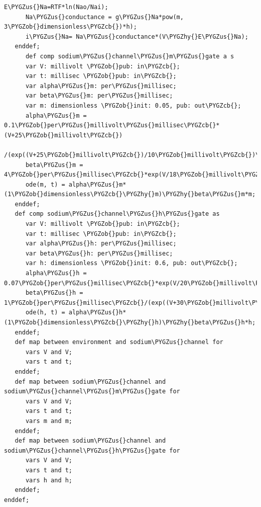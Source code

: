 \documentclass[a4paper,10pt,english]{sphinxmanual}
\def\PYGZus{\char`\_}
\def\PYGZob{\char`\{}
\def\PYGZcb{\char`\}}
\def\PYGZhy{\char`\-}
\begin{document}
\begin{Verbatim}[commandchars=\\\{\}]
      E\PYGZus{}Na=RTF*ln(Nao/Nai);
      Na\PYGZus{}conductance = g\PYGZus{}Na*pow(m, 3\PYGZob{}dimensionless\PYGZcb{})*h);
      i\PYGZus{}Na= Na\PYGZus{}conductance*(V\PYGZhy{}E\PYGZus{}Na);
   enddef;
      def comp sodium\PYGZus{}channel\PYGZus{}m\PYGZus{}gate a s
      var V: millivolt \PYGZob{}pub: in\PYGZcb{};
      var t: millisec \PYGZob{}pub: in\PYGZcb{};
      var alpha\PYGZus{}m: per\PYGZus{}millisec;
      var beta\PYGZus{}m: per\PYGZus{}millisec;
      var m: dimensionless \PYGZob{}init: 0.05, pub: out\PYGZcb{};
      alpha\PYGZus{}m = 0.1\PYGZob{}per\PYGZus{}millivolt\PYGZus{}millisec\PYGZcb{}*(V+25\PYGZob{}millivolt\PYGZcb{})
         /(exp((V+25\PYGZob{}millivolt\PYGZcb{})/10\PYGZob{}millivolt\PYGZcb{})\PYGZhy{}1\PYGZob{}dimensionless\PYGZcb{});
      beta\PYGZus{}m = 4\PYGZob{}per\PYGZus{}millisec\PYGZcb{}*exp(V/18\PYGZob{}millivolt\PYGZcb{});
      ode(m, t) = alpha\PYGZus{}m*(1\PYGZob{}dimensionless\PYGZcb{}\PYGZhy{}m)\PYGZhy{}beta\PYGZus{}m*m;
   enddef;
   def comp sodium\PYGZus{}channel\PYGZus{}h\PYGZus{}gate as
      var V: millivolt \PYGZob{}pub: in\PYGZcb{};
      var t: millisec \PYGZob{}pub: in\PYGZcb{};
      var alpha\PYGZus{}h: per\PYGZus{}millisec;
      var beta\PYGZus{}h: per\PYGZus{}millisec;
      var h: dimensionless \PYGZob{}init: 0.6, pub: out\PYGZcb{};
      alpha\PYGZus{}h = 0.07\PYGZob{}per\PYGZus{}millisec\PYGZcb{}*exp(V/20\PYGZob{}millivolt\PYGZcb{});
      beta\PYGZus{}h = 1\PYGZob{}per\PYGZus{}millisec\PYGZcb{}/(exp((V+30\PYGZob{}millivolt\PYGZcb{})/10\PYGZob{}millivolt\PYGZcb{})+1\PYGZob{}dimensionless\PYGZcb{});
      ode(h, t) = alpha\PYGZus{}h*(1\PYGZob{}dimensionless\PYGZcb{}\PYGZhy{}h)\PYGZhy{}beta\PYGZus{}h*h;
   enddef;
   def map between environment and sodium\PYGZus{}channel for
      vars V and V;
      vars t and t;
   enddef;
   def map between sodium\PYGZus{}channel and sodium\PYGZus{}channel\PYGZus{}m\PYGZus{}gate for
      vars V and V;
      vars t and t;
      vars m and m;
   enddef;
   def map between sodium\PYGZus{}channel and sodium\PYGZus{}channel\PYGZus{}h\PYGZus{}gate for
      vars V and V;
      vars t and t;
      vars h and h;
   enddef;
enddef;
\end{Verbatim}
\end{document}
